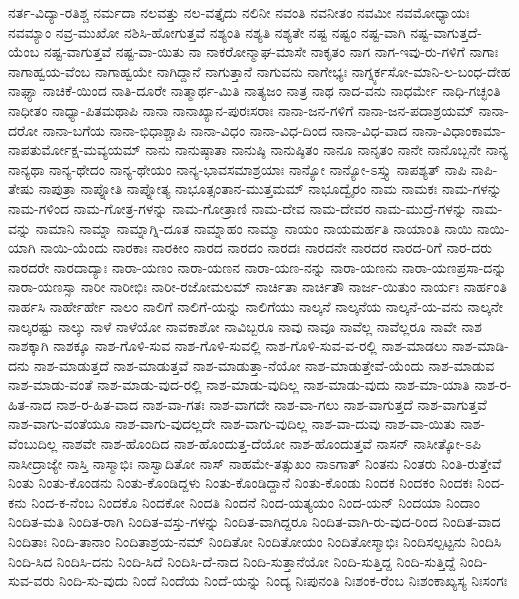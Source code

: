 {ನರ್ತ-ವಿದ್ಯಾ-ರತಿಶ್ಚ
ನರ್ಮದಾ
ನಲವತ್ತು
ನಲ-ವತ್ತೈದು
ನಲಿನೀ
ನವಂತಿ
ನವನೀತಂ
ನವಮೀ
ನವಮೋಧ್ಯಾಯಃ
ನವಮ್ಯಾಂ
ನವ್ರ-ಮುಖೋ
ನಶಿಸಿ-ಹೋಗುತ್ತವೆ
ನಶ್ಯಂತಿ
ನಶ್ಯತಿ
ನಶ್ಯತೇ
ನಷ್ಟ
ನಷ್ಟಂ
ನಷ್ಟ-ವಾಗಿ
ನಷ್ಟ-ವಾಗುತ್ತದೆ-ಯೆಂಬ
ನಷ್ಟ-ವಾಗುತ್ತವೆ
ನಷ್ಟ-ವಾ-ಯಿತು
ನಾ
ನಾಕರೋನ್ಮಾಘ-ಮಾಸೇ
ನಾಕೃತಂ
ನಾಗ
ನಾಗ-ಇವು-ರು-ಗಳಿಗೆ
ನಾಗಾಃ
ನಾಗಾಹ್ವಯ-ವೆಂಬ
ನಾಗಾಹ್ವಯೇ
ನಾಗಿದ್ದಾನೆ
ನಾಗುತ್ತಾನೆ
ನಾಗುವನು
ನಾಗೇಭ್ಯಃ
ನಾಗ್ನ್ಯರ್ಕಸೋ-ಮಾನಿ-ಲ-ಬಂಧ-ದೇಹ
ನಾಘ್ಯಾ
ನಾಚಿಕೆ-ಯಿಂದ
ನಾತಿ-ದೂರೇ
ನಾತ್ಮಾರ್ಥ-ಮಿತಿ
ನಾತ್ಯಜಂ
ನಾತ್ರ
ನಾಥ
ನಾದ-ವನು
ನಾಧರ್ಮೇ
ನಾಧಿ-ಗಚ್ಛಂತಿ
ನಾಧೀತಂ
ನಾಧ್ಯಾ-ಪಿತಮಥಾಪಿ
ನಾನಾ
ನಾನಾಖ್ಯಾನ-ಪುರಃಸರಾಃ
ನಾನಾ-ಜನ-ಗಳಿಗೆ
ನಾನಾ-ಜನ-ಪದಾಶ್ರಯಮ್
ನಾನಾ-ದರೋ
ನಾನಾ-ಬಗೆಯ
ನಾನಾ-ಭಿಧಾಶ್ಚಾಪಿ
ನಾನಾ-ವಿಧಂ
ನಾನಾ-ವಿಧ-ದಿಂದ
ನಾನಾ-ವಿಧ-ವಾದ
ನಾನಾ-ವಿಧಾಂಕಾಮಾ-ನಾಪತುರ್ಮೋಕ್ಷ-ಮವ್ಯಯಮ್
ನಾನು
ನಾನುಷ್ಠಾತಾ
ನಾನುಷ್ಠಿ
ನಾನುಷ್ಠಿತಂ
ನಾನೂ
ನಾನೃತಂ
ನಾನೇ
ನಾನೊಬ್ಬನೇ
ನಾನ್ಯ
ನಾನ್ಯಥಾ
ನಾನ್ಯ-ಥೇದಂ
ನಾನ್ಯ-ಥೇಯಂ
ನಾನ್ಯ-ಭಾವಸಮಾಶ್ರಯಾಃ
ನಾನ್ಯೋ
ನಾನ್ಯೋ-ಽಸ್ತ್ಯು
ನಾಪಶ್ಯತ್
ನಾಪಿ
ನಾಪಿ-ತೇಷು
ನಾಪುತ್ರಾ
ನಾಪ್ನೋತಿ
ನಾಪ್ನೋತ್ಯ
ನಾಭೂತ್ಸಂತಾನ-ಮುತ್ತಮಮ್
ನಾಭೂದ್ವೈರಂ
ನಾಮ
ನಾಮಕಃ
ನಾಮ-ಗಳನ್ನು
ನಾಮ-ಗಳಿಂದ
ನಾಮ-ಗೋತ್ರ-ಗಳನ್ನು
ನಾಮ-ಗೋತ್ರಾಣಿ
ನಾಮ-ದೇವ
ನಾಮ-ದೇವರ
ನಾಮ-ಮುದ್ರೆ-ಗಳನ್ನು
ನಾಮ-ವನ್ನು
ನಾಮಾನಿ
ನಾಮ್ನಾ
ನಾಮ್ನಾಗ್ನಿ-ದೂತ
ನಾಮ್ನಾಹಂ
ನಾಮ್ಮಾ
ನಾಯಂ
ನಾಯಮರ್ಹತಿ
ನಾಯಾಂತಿ
ನಾಯಿ
ನಾಯಿ-ಯಾಗಿ
ನಾಯಿ-ಯೆಂದು
ನಾರಕಾಃ
ನಾರಕೀಂ
ನಾರದ
ನಾರದಂ
ನಾರದಃ
ನಾರದನೇ
ನಾರದರ
ನಾರದ-ರಿಗೆ
ನಾರ-ದರು
ನಾರದರೇ
ನಾರದಾದ್ಯಾಃ
ನಾರಾ-ಯಣಂ
ನಾರಾ-ಯಣನ
ನಾರಾ-ಯಣ-ನನ್ನು
ನಾರಾ-ಯಣನು
ನಾರಾ-ಯಣಪ್ರಸಾ-ದನ್ನು
ನಾರಾ-ಯಣಸ್ಸಾ
ನಾರೀ
ನಾರೀಭಿಃ
ನಾರೀ-ರಜೋಮಲಮ್
ನಾರ್ಚಿತಾ
ನಾರ್ಚಿತೌ
ನಾರ್ಜ-ಯಿತುಂ
ನಾರ್ಯಃ
ನಾರ್ಹಂತಿ
ನಾರ್ಹಸಿ
ನಾರ್ಹೇರ್ಹೇ
ನಾಲಂ
ನಾಲಿಗೆ
ನಾಲಿಗೆ-ಯನ್ನು
ನಾಲಿಗೆಯು
ನಾಲ್ಕನೆ
ನಾಲ್ಕನೆಯ
ನಾಲ್ಕನೆ-ಯ-ವನು
ನಾಲ್ಕನೇ
ನಾಲ್ಕರಷ್ಟು
ನಾಲ್ಕು
ನಾಳೆ
ನಾಳೆಯೋ
ನಾವಕಾಶೋ
ನಾವಿಬ್ಬರೂ
ನಾವು
ನಾವೂ
ನಾವೆಲ್ಲ
ನಾವೆಲ್ಲರೂ
ನಾವೇ
ನಾಶ
ನಾಶಕ್ಕಾಗಿ
ನಾಶಕ್ಕೂ
ನಾಶ-ಗೊಳಿ-ಸುವ
ನಾಶ-ಗೊಳಿ-ಸುವಲ್ಲಿ
ನಾಶ-ಗೊಳಿ-ಸುವ-ವ-ರಲ್ಲಿ
ನಾಶ-ಮಾಡಲು
ನಾಶ-ಮಾಡಿ-ದನು
ನಾಶ-ಮಾಡುತ್ತದೆ
ನಾಶ-ಮಾಡುತ್ತವೆ
ನಾಶ-ಮಾಡುತ್ತಾ-ನೆಯೋ
ನಾಶ-ಮಾಡುತ್ತೇವೆ-ಯೆಂದು
ನಾಶ-ಮಾಡುವ
ನಾಶ-ಮಾಡು-ವಂತೆ
ನಾಶ-ಮಾಡು-ವುದ-ರಲ್ಲಿ
ನಾಶ-ಮಾಡು-ವುದಿಲ್ಲ
ನಾಶ-ಮಾಡು-ವುದು
ನಾಶ-ಮಾ-ಯಾತಿ
ನಾಶ-ರ-ಹಿತ-ನಾದ
ನಾಶ-ರ-ಹಿತ-ವಾದ
ನಾಶ-ವಾ-ಗತಃ
ನಾಶ-ವಾಗದೇ
ನಾಶ-ವಾ-ಗಲು
ನಾಶ-ವಾಗುತ್ತದೆ
ನಾಶ-ವಾಗುತ್ತವೆ
ನಾಶ-ವಾಗು-ವಂತೆಯೂ
ನಾಶ-ವಾಗು-ವುದಲ್ಲದೇ
ನಾಶ-ವಾಗು-ವುದಿಲ್ಲ
ನಾಶ-ವಾ-ದುವು
ನಾಶ-ವಾ-ಯಿತು
ನಾಶ-ವೆಂಬುದಿಲ್ಲ
ನಾಶವೇ
ನಾಶ-ಹೊಂದಿದ
ನಾಶ-ಹೊಂದುತ್ತ-ದೆಯೋ
ನಾಶ-ಹೊಂದುತ್ತವೆ
ನಾಸನ್
ನಾಸೀತ್ಕೋ-ಽಪಿ
ನಾಸೀದ್ರಾಜ್ಯೇ
ನಾಸ್ತಿ
ನಾಸ್ಮಾಭಿಃ
ನಾಸ್ವಾದಿತೋ
ನಾಸ್
ನಾಹಮೇ-ತತ್ಸುಖಂ
ನಾಽಗಾತ್
ನಿಂತನು
ನಿಂತರು
ನಿಂತಿ-ರುತ್ತೇವೆ
ನಿಂತು
ನಿಂತು-ಕೊಂಡನು
ನಿಂತು-ಕೊಂಡಿದ್ದಳು
ನಿಂತು-ಕೊಂಡಿದ್ದಾನೆ
ನಿಂತು-ಕೊಂಡು
ನಿಂದಕ
ನಿಂದಕಂ
ನಿಂದಕಃ
ನಿಂದ-ಕನು
ನಿಂದ-ಕ-ನೆಂಬ
ನಿಂದಕೊ
ನಿಂದಕೋ
ನಿಂದತಿ
ನಿಂದನೆ
ನಿಂದ-ಯತ್ಯಯಂ
ನಿಂದ-ಯನ್
ನಿಂದಯಾ
ನಿಂದಾಂ
ನಿಂದಿತ-ಮತಿ
ನಿಂದಿತ-ರಾಗಿ
ನಿಂದಿತ-ವಸ್ತು-ಗಳನ್ನು
ನಿಂದಿತ-ವಾಗಿದ್ದರೂ
ನಿಂದಿತ-ವಾಗಿ-ರು-ವುದ-ರಿಂದ
ನಿಂದಿತ-ವಾದ
ನಿಂದಿತಾಃ
ನಿಂದಿ-ತಾನಾಂ
ನಿಂದಿತಾಶ್ರಯ-ನಮ್
ನಿಂದಿತೋ
ನಿಂದಿತೋಯಂ
ನಿಂದಿತೋಸ್ಮಾಭಿಃ
ನಿಂದಿಸಲ್ಪಟ್ಟನು
ನಿಂದಿಸಿ
ನಿಂದಿ-ಸಿದ
ನಿಂದಿಸಿ-ದನು
ನಿಂದಿ-ಸಿದೆ
ನಿಂದಿಸಿ-ದೆ-ನಾದ
ನಿಂದಿ-ಸುತ್ತಾನೆಯೋ
ನಿಂದಿ-ಸುತ್ತಿದ್ದ
ನಿಂದಿ-ಸುತ್ತಿದ್ದೆ
ನಿಂದಿ-ಸುವ-ವರು
ನಿಂದಿ-ಸು-ವುದು
ನಿಂದೆ
ನಿಂದೆಯ
ನಿಂದೆ-ಯನ್ನು
ನಿಂದ್ಯ
ನಿಃಪುನಂತಿ
ನಿಃಶಂಕ-ರೆಂಬ
ನಿಃಶಂಕಾಖ್ಯಸ್ಯ
ನಿಃಸಂಗಃ
}
